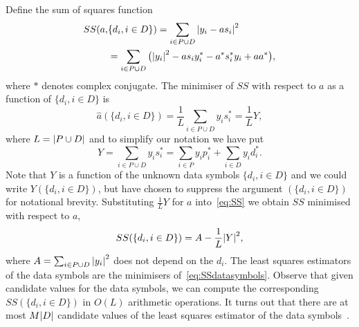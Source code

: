 \documentclass[journal]{IEEEtran}
\begin{document}
Define the sum of squares function
\begin{align}
SS(a, &\{d_i, i \in D\}) = \sum_{i \in P \cup D} {\left\vert  y_i - a s_i  \right\vert}^2 \nonumber \\
&= \sum_{i \in P \cup D} \big( {\left\vert y_i \right\vert}^2 - a s_i y_i^* - a^* s_i^* y_i + aa^* \big), \label{eq:SS}
\end{align}
where $*$ denotes complex conjugate.  The minimiser of $SS$ with respect to $a$ as a function of $\{d_i, i \in D\}$ is
\begin{equation}\label{eq:hata}
\hat{a}(\{d_i, i \in D\}) = \frac{1}{L} \sum_{i \in P \cup D} y_i s_i^* = \frac{1}{L} Y,
\end{equation}
where $L = {\left\vert P \cup D \right\vert}$ and to simplify our notation we have put 
\[
Y = \sum_{i \in P \cup D} y_i s_i^* = \sum_{i \in P } y_i p_i^* + \sum_{i \in D } y_i d_i^*.
\]  
Note that $Y$ is a function of the unknown data symbols $\{ d_i, i \in D\}$ and we could write $Y(\{ d_i, i \in D\})$, but have chosen to suppress the argument $(\{ d_i, i \in D\})$ for notational brevity.  Substituting $\frac{1}{L}Y$ for $a$ into~\eqref{eq:SS} we obtain $SS$ minimised with respect to $a$,
\begin{equation}\label{eq:SSdatasymbols}
SS(\{d_i, i \in D\}) = A - \frac{1}{L}{\left\vert Y \right\vert}^2,
\end{equation}
where $A = \sum_{i \in P \cup D}{\left\vert y_i \right\vert}^2$ does not depend on the $d_i$.  The least squares estimators of the data symbols are the minimisers of~\eqref{eq:SSdatasymbols}.  Observe that given candidate values for the data symbols, we can compute the corresponding $SS(\{d_i, i \in D\})$ in $O(L)$ arithmetic operations.  It turns out that there are at most $M{\left\vert D \right\vert}$ candidate values of the least squares estimator of the data symbols~\cite{Sweldens2001,Mackenthun1994}.  %
\end{document}

